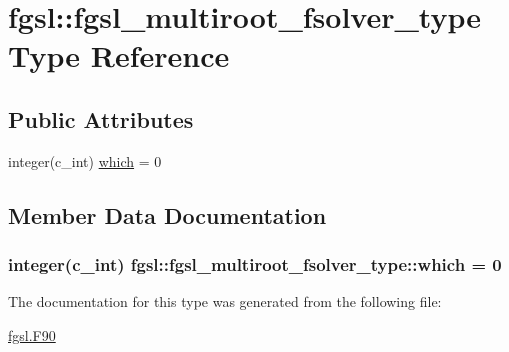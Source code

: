 \hypertarget{structfgsl_1_1fgsl__multiroot__fsolver__type}{}\section{fgsl\+:\+:fgsl\+\_\+multiroot\+\_\+fsolver\+\_\+type Type Reference}
\label{structfgsl_1_1fgsl__multiroot__fsolver__type}
\subsection*{Public Attributes}
\begin{DoxyCompactItemize}
\item 
integer(c\+\_\+int) \hyperlink{structfgsl_1_1fgsl__multiroot__fsolver__type_a556e9bd612764e527f926ac1342a7016}{which} = 0
\end{DoxyCompactItemize}


\subsection{Member Data Documentation}
\hypertarget{structfgsl_1_1fgsl__multiroot__fsolver__type_a556e9bd612764e527f926ac1342a7016}{}
\subsubsection[{which}]{\setlength{\rightskip}{0pt plus 5cm}integer(c\+\_\+int) fgsl\+::fgsl\+\_\+multiroot\+\_\+fsolver\+\_\+type\+::which = 0}\label{structfgsl_1_1fgsl__multiroot__fsolver__type_a556e9bd612764e527f926ac1342a7016}


The documentation for this type was generated from the following file\+:\begin{DoxyCompactItemize}
\item 
\hyperlink{fgsl_8F90}{fgsl.\+F90}\end{DoxyCompactItemize}
